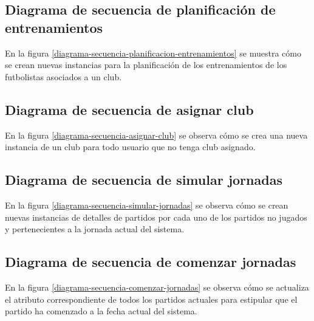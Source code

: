 
\subsection*{Diagrama de secuencia de planificación de entrenamientos}
En la figura \ref{diagrama-secuencia-planificacion-entrenamientos} se muestra
cómo se crean nuevas instancias para la planificación de los entrenamientos de
los futbolistas asociados a un club.


\subsection*{Diagrama de secuencia de asignar club}
En la figura \ref{diagrama-secuencia-asignar-club} se observa cómo se crea una
nueva instancia de un club para todo usuario que no tenga club asignado.


\subsection*{Diagrama de secuencia de simular jornadas}
En la figura \ref{diagrama-secuencia-simular-jornadas} se observa cómo se crean
nuevas instancias de detalles de partidos por cada uno de los partidos no
jugados y pertenecientes a la jornada actual del sistema.


\subsection*{Diagrama de secuencia de comenzar jornadas}
En la figura \ref{diagrama-secuencia-comenzar-jornadas} se observa cómo se
actualiza el atributo correspondiente de todos los partidos actuales para
estipular que el partido ha comenzado a la fecha actual del sistema.  \newpage

